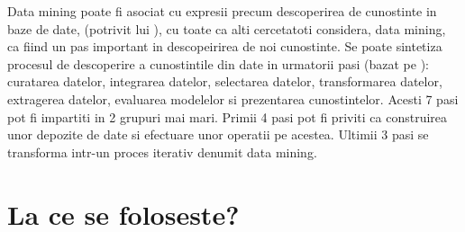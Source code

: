  Data mining poate fi asociat cu expresii precum descoperirea de cunostinte in baze de date, (potrivit lui \cite{JiaweiIntro}), cu toate ca alti cercetatoti considera, data mining, ca fiind un pas important in descopeirirea de noi cunostinte. Se poate sintetiza procesul de descoperire a cunostintile din date in urmatorii pasi (bazat pe \cite{JiaweiIntro}): curatarea datelor, integrarea datelor, selectarea datelor, transformarea datelor, extragerea datelor, evaluarea modelelor si prezentarea cunostintelor. Acesti 7 pasi pot fi impartiti in 2 grupuri mai mari. Primii 4 pasi pot fi priviti ca construirea unor depozite de date si efectuare unor operatii pe acestea. Ultimii 3 pasi se transforma intr-un proces iterativ denumit data mining.  

\section{La ce se foloseste?}

